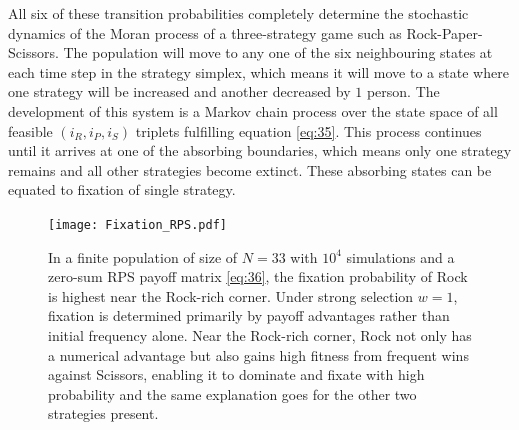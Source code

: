 \documentclass{article}
\begin{document}
All six of these transition probabilities completely determine the stochastic dynamics of the Moran process of a three-strategy game such as Rock-Paper-Scissors.
The population will move to any one of the six neighbouring states at each time step in the strategy simplex, which means it will move to a state where one strategy will be increased and another decreased by $1$ person.
The development of this system is a Markov chain process over the state space of all feasible $(i_R, i_P, i_S)$ triplets fulfilling equation \eqref{eq:35}.
This process continues until it arrives at one of the absorbing boundaries, which means only one strategy remains and all other strategies become extinct.
These absorbing states can be equated to fixation of single strategy.
\begin{figure}[H]
    \centering
    \texttt{[image: Fixation\_RPS.pdf]}
    \caption{In a finite population of size of $N = 33$ with $ 10^4$ simulations and a zero-sum RPS payoff matrix \eqref{eq:36}, the fixation probability of Rock is highest near the Rock-rich corner. Under strong selection $w=1$, fixation is determined primarily by payoff advantages rather than initial frequency alone. Near the Rock-rich corner, Rock not only has a numerical advantage but also gains high fitness from frequent wins against Scissors, enabling it to dominate and fixate with high probability and the same explanation goes for the other two strategies present.}
    \label{fig:6}
\end{figure}
\end{document}
